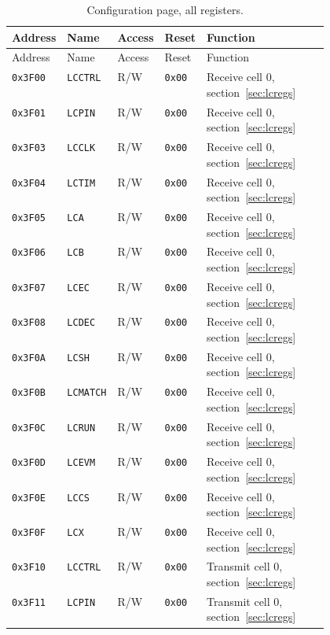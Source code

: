 \begin{longtable}{@{}llllp{0.47\linewidth}@{}}
\caption{Configuration page, all registers.}\\
\toprule
Address & Name & Access & Reset & Function \\
\midrule
\endfirsthead
\toprule
Address & Name & Access & Reset & Function \\
\midrule
\endhead
\bottomrule
\endfoot
\texttt{0x3F00} & \texttt{LCCTRL} & R/W & \texttt{0x00} & Receive cell 0, section~\ref{sec:lcregs} \\
\texttt{0x3F01} & \texttt{LCPIN} & R/W & \texttt{0x00} & Receive cell 0, section~\ref{sec:lcregs} \\
\texttt{0x3F03} & \texttt{LCCLK} & R/W & \texttt{0x00} & Receive cell 0, section~\ref{sec:lcregs} \\
\texttt{0x3F04} & \texttt{LCTIM} & R/W & \texttt{0x00} & Receive cell 0, section~\ref{sec:lcregs} \\
\texttt{0x3F05} & \texttt{LCA} & R/W & \texttt{0x00} & Receive cell 0, section~\ref{sec:lcregs} \\
\texttt{0x3F06} & \texttt{LCB} & R/W & \texttt{0x00} & Receive cell 0, section~\ref{sec:lcregs} \\
\texttt{0x3F07} & \texttt{LCEC} & R/W & \texttt{0x00} & Receive cell 0, section~\ref{sec:lcregs} \\
\texttt{0x3F08} & \texttt{LCDEC} & R/W & \texttt{0x00} & Receive cell 0, section~\ref{sec:lcregs} \\
\texttt{0x3F0A} & \texttt{LCSH} & R/W & \texttt{0x00} & Receive cell 0, section~\ref{sec:lcregs} \\
\texttt{0x3F0B} & \texttt{LCMATCH} & R/W & \texttt{0x00} & Receive cell 0, section~\ref{sec:lcregs} \\
\texttt{0x3F0C} & \texttt{LCRUN} & R/W & \texttt{0x00} & Receive cell 0, section~\ref{sec:lcregs} \\
\texttt{0x3F0D} & \texttt{LCEVM} & R/W & \texttt{0x00} & Receive cell 0, section~\ref{sec:lcregs} \\
\texttt{0x3F0E} & \texttt{LCCS} & R/W & \texttt{0x00} & Receive cell 0, section~\ref{sec:lcregs} \\
\texttt{0x3F0F} & \texttt{LCX} & R/W & \texttt{0x00} & Receive cell 0, section~\ref{sec:lcregs} \\
\midrule
\texttt{0x3F10} & \texttt{LCCTRL} & R/W & \texttt{0x00} & Transmit cell 0, section~\ref{sec:lcregs} \\
\texttt{0x3F11} & \texttt{LCPIN} & R/W & \texttt{0x00} & Transmit cell 0, section~\ref{sec:lcregs} \\

\end{longtable}
